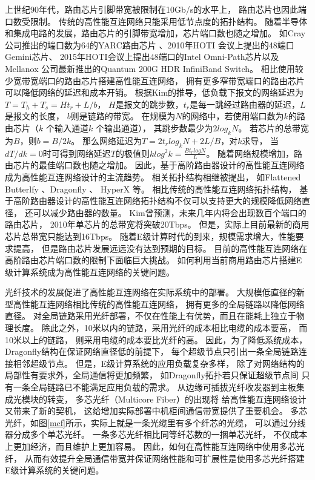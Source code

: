上世纪90年代，路由芯片引脚带宽被限制在10Gb/s的水平上，
路由芯片也因此端口数受限制。
传统的高性能互连网络只能采用低节点度的拓扑结构。
随着半导体和集成电路的发展，路由芯片的引脚带宽增加，芯片端口数也随之增加。
如Cray 公司推出的端口数为64的YARC路由芯片
、2010年HOTI
会议上提出的48端口Gemini芯片、
2015年HOTI会议上提出48端口的Intel Omni-Path芯片以及
Mellanox 公司最新推出的Quantum 200G HDR InfiniBand Switch。
相比使用较少宽带宽端口的路由芯片搭建高性能互连网络，
拥有更多窄带宽端口的路由芯片可以降低网络的延迟和成本开销。
根据Kim的推导，低负载下报文的网络延迟为$T=T_h+T_s=Ht_r+L/b$，
$H$是报文的跳步数，$t_r$是每一跳经过路由器的延迟，$L$是报文的长度，
$b$则是链路的带宽。
在规模为$N$的网络中，若使用端口数为$k$的路由芯片（$k$ 个输入通道$k$ 个输出通道），
其跳步数最少为$2log_kN$。
若芯片的总带宽为$B$，则$b=B/2k$。
那么网络延迟为$T=2t_rlog_kN+2L/B$，对$k$求导，
当$dT/dk=0$时可得到网络延迟$T$的极值则$klog^2k=\frac{Bt_rlogN}{L}$。
随着网络规模增加，路由芯片的最佳端口数也随之增加。
因此，基于高阶路由器设计的高性能互连网络成为高性能互连网络设计的主流趋势。
相关拓扑结构相继被提出，
如Flattened Butterlfy 、Dragonfly 、
HyperX 等。
相比传统的高性能互连网络拓扑结构，
基于高阶路由器设计的高性能互连网络拓扑结构不仅可以支持更大的规模降低网络直径，
还可以减少路由器的数量。
Kim曾预测，未来几年内将会出现数百个端口的路由芯片，
2010年单芯片的总带宽将突破20Tbps。
但是，实际上目前最新的商用芯片总带宽只能达到16Tbps。
随着E级计算时代的到来，规模需求增大，性能要求提高，
但是路由芯片发展远远没有达到预期的目标。
目前的高性能互连网络在高阶路由芯片端口数的限制下面临巨大挑战。
如何利用当前商用路由芯片搭建E级计算系统成为高性能互连网络的关键问题。

光纤技术的发展促进了高性能互连网络在实际系统中的部署。
大规模低直径的新型高性能互连网络相比传统的高性能互连网络，
拥有更多的全局链路以降低网络直径。
对全局链路采用光纤部署，不仅在性能上有优势，而且在能耗上独立于物理长度。
除此之外，10米以内的链路，采用光纤的成本相比电缆的成本要高，
而10米以上的链路，
则采用电缆的成本要比光纤的高。
因此，为了降低系统成本，
Dragonfly结构在保证网络直径低的前提下，
每个超级节点只引出一条全局链路连接相邻超级节点。
但是，E级计算系统的应用负载复杂多样，
除了对网络结构的局部性有要求外，全局通信将更加频繁，
如Dragonfly拓扑若只保证超级节点间
只有一条全局链路已不能满足应用负载的需求。
从边缘可插拔光纤收发器到主板集成光模块的转变，
多芯光纤（Multicore Fiber）的出现将
给高性能互连网络设计又带来了新的契机，
这给增加实际部署中机柜间通信带宽提供了重要机会。
多芯光纤，如图\ref{mcf}所示，实际上就是一条光缆里有多个纤芯的光缆，
可以通过分线器分成多个单芯光纤。
一条多芯光纤相比同等纤芯数的一捆单芯光纤，
不仅成本上更加经济，而且维护上更加容易。
因此，如何在高性能互连网络中使用多芯光纤，
从而有效提升全局通信带宽并保证网络性能和可扩展性是使用多芯光纤搭建
E级计算系统的关键问题。

